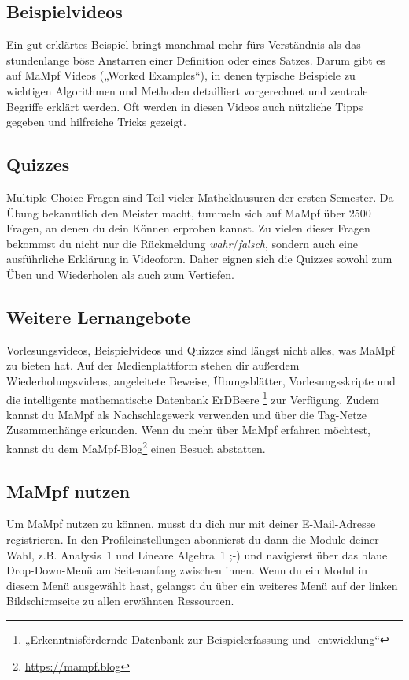 \subsection{Beispielvideos}
Ein gut erklärtes Beispiel bringt manchmal mehr fürs Verständnis als das stundenlange böse Anstarren einer Definition oder eines Satzes. Darum gibt es auf MaMpf Videos („Worked Examples“), in denen typische Beispiele zu wichtigen Algorithmen und Methoden detailliert vorgerechnet und zentrale Begriffe erklärt werden. Oft werden in diesen Videos auch nützliche Tipps gegeben und hilfreiche Tricks gezeigt.

\subsection{Quizzes}
Multiple-Choice-Fragen sind Teil vieler Matheklausuren der ersten Semester. Da Übung bekanntlich den Meister macht, tummeln sich auf MaMpf über 2500 Fragen, an denen du dein Können erproben kannst. Zu vielen dieser Fragen bekommst du nicht nur die Rückmeldung \emph{wahr}/\emph{falsch}, sondern auch eine ausführliche Erklärung in Videoform. Daher eignen sich die Quizzes sowohl zum Üben und Wiederholen als auch zum Vertiefen.

\subsection{Weitere Lernangebote}
Vorlesungsvideos, Beispielvideos und Quizzes sind längst nicht alles, was MaMpf zu bieten hat.
Auf der Medienplattform stehen dir außerdem Wiederholungsvideos, angeleitete Beweise, Übungsblätter, Vorlesungsskripte und die intelligente mathematische Datenbank ErDBeere \footnote{„Erkenntnisfördernde Datenbank zur Beispielerfassung und -entwicklung“} zur Verfügung. Zudem kannst du MaMpf als Nachschlagewerk verwenden und über die Tag-Netze Zusammenhänge erkunden. Wenn du mehr über MaMpf erfahren möchtest, kannst du dem MaMpf-Blog\footnote{\url{https://mampf.blog}} einen Besuch abstatten.  

\subsection{MaMpf nutzen}
Um MaMpf nutzen zu können, musst du dich nur mit deiner E-Mail-Adresse registrieren. In den Profileinstellungen abonnierst du dann die Module deiner Wahl, z.B. Analysis~1 und Lineare Algebra~1 ;-) und navigierst über das blaue Drop-Down-Menü am Seitenanfang zwischen ihnen. Wenn du ein Modul in diesem Menü ausgewählt hast, gelangst du über ein weiteres Menü auf der linken Bildschirmseite zu allen erwähnten Ressourcen.
